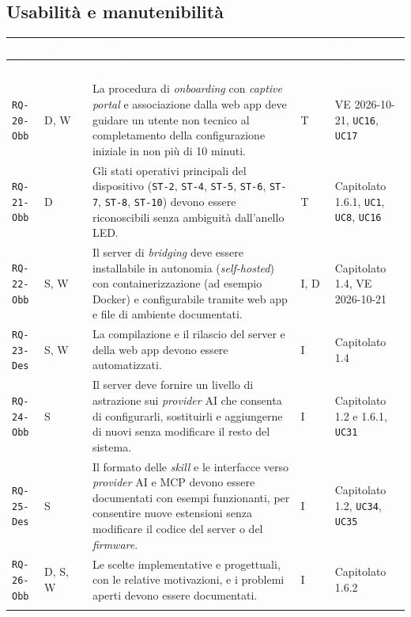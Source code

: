 \documentclass[12pt,a4paper]{article}
\newcommand{\thc}[1]{\textcolor{white}{\textbf{#1}}}
\newcommand{\rl}{\\ \arrayrulecolor{bfline}\hline}
\begin{document}
\subsection{Usabilità e manutenibilità}
\begin{longtable}{>{\raggedright\arraybackslash}p{}>{\centering\arraybackslash}p{}>{\raggedright\arraybackslash}p{}>{\centering\arraybackslash}p{}>{\raggedright\arraybackslash}p{}}
\rowcolor{bfblue}\thc{ID} & \thc{Comp.} & \thc{Requisito} & \thc{Ver.} & \thc{Fonti} \\ \endfirsthead
\rowcolor{bfblue}\thc{ID} & \thc{Comp.} & \thc{Requisito} & \thc{Ver.} & \thc{Fonti} \\ \endhead
\texttt{RQ-20-Obb} & D, W & La procedura di \emph{onboarding} con \emph{captive portal} e associazione dalla web app deve guidare un utente non tecnico al completamento della configurazione iniziale in non più di 10 minuti. & T & VE 2026-10-21, \texttt{UC16}, \texttt{UC17} \rl

\texttt{RQ-21-Obb} & D & Gli stati operativi principali del dispositivo (\texttt{ST-2}, \texttt{ST-4}, \texttt{ST-5}, \texttt{ST-6}, \texttt{ST-7}, \texttt{ST-8}, \texttt{ST-10}) devono essere riconoscibili senza ambiguità dall'anello LED. & T & Capitolato 1.6.1, \texttt{UC1}, \texttt{UC8}, \texttt{UC16} \rl

\texttt{RQ-22-Obb} & S, W & Il server di \emph{bridging} deve essere installabile in autonomia (\emph{self-hosted}) con containerizzazione (ad esempio Docker) e configurabile tramite web app e file di ambiente documentati. & I, D & Capitolato 1.4, VE 2026-10-21 \rl

\texttt{RQ-23-Des} & S, W & La compilazione e il rilascio del server e della web app devono essere automatizzati. & I & Capitolato 1.4 \rl

\texttt{RQ-24-Obb} & S & Il server deve fornire un livello di astrazione sui \emph{provider} AI che consenta di configurarli, sostituirli e aggiungerne di nuovi senza modificare il resto del sistema. & I & Capitolato 1.2 e 1.6.1, \texttt{UC31} \rl

\texttt{RQ-25-Des} & S & Il formato delle \emph{skill} e le interfacce verso \emph{provider} AI e MCP devono essere documentati con esempi funzionanti, per consentire nuove estensioni senza modificare il codice del server o del \emph{firmware}. & I & Capitolato 1.2, \texttt{UC34}, \texttt{UC35} \rl

\texttt{RQ-26-Obb} & D, S, W & Le scelte implementative e progettuali, con le relative motivazioni, e i problemi aperti devono essere documentati. & I & Capitolato 1.6.2 \rl

\end{longtable}
\end{document}
